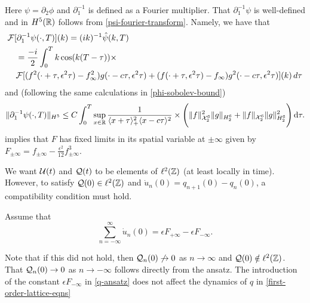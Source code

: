 Here \(\psi = \partial_2 \phi\) and \(\partial_1^{-1}\) is defined as a Fourier multiplier. That \(\partial_1^{-1}\psi\) is well-defined and in \(H^5(\mathbb{R})\) follows from \cref{psi-fourier-transform}. Namely, we have that 
\begin{equation*}
\begin{aligned}
	&\mathcal{F}[\partial_1^{-1} \psi(\cdot, T)](k) = (ik)^{-1} \hat\psi(k,T) \\
	&\quad = \frac{-i} 2 \int_0^T k \cos(k(T-\tau)) \times \\ &\quad \mathcal{F}[(f^2(\cdot+\tau,\epsilon^2\tau)-f_\infty^2)g(\cdot-c\tau,\epsilon^2\tau) +(f(\cdot+\tau,\epsilon^2\tau)-f_\infty)g^2(\cdot-c\tau,\epsilon^2\tau)](k) \, d\tau
\end{aligned}
\end{equation*}
and (following the same calculations in \cref{phi-sobolev-bound}) 
\begin{equation*}
	\| \partial_1^{-1}\psi(\cdot,T) \|_{H^5} \leq C \int_0^T \sup_{x\in\mathbb{R}} \frac 1 {\langle x + \tau\rangle_+^2 \langle x - c\tau\rangle^2} \times \Bigg( \|f\|^2_{\mathcal X^{6}_{2}} \| g \|_{H^{6}_2} + \|f\|_{\mathcal X^{6}_{2}} \| g \|^2_{H^{6}_2} \Bigg) \, \mathrm d \tau. 
\end{equation*} implies that \(F\) has fixed limits in its spatial variable at \(\pm \infty\) given by \(F_{\pm\infty} = f_{\pm\infty} -\frac{\epsilon^2}{12} f^3_{\pm\infty}\).

We want \(\mathcal{U}(t)\) and \(\mathcal{Q}(t)\) to be elements of \(\ell^2(\mathbb{Z})\) (at least locally in time). However, to satisfy \(\mathcal{Q}(0)\in\ell^2(\mathbb{Z})\) and \(\dot u_n(0) = q_{n+1}(0) - q_n(0)\), a compatibility condition must hold.
\begin{assum}\label{assumption-2}
	Assume that \[\sum_{n=-\infty}^\infty \dot u_n(0) = \epsilon F_{+\infty} - \epsilon F_{-\infty}.\]
\end{assum}
Note that if this did not hold, then \(\mathcal{Q}_n(0)\not\to 0\) as \(n\to\infty\) and \(\mathcal{Q}(0)\notin \ell^2(\mathbb{Z})\). That \(\mathcal{Q}_n(0) \to 0\) as \(n\to-\infty\) follows directly from the ansatz. The introduction of the constant \(\epsilon F_{-\infty}\) in \cref{q-ansatz} does not affect the dynamics of \(q\) in \cref{first-order-lattice-eqns}

